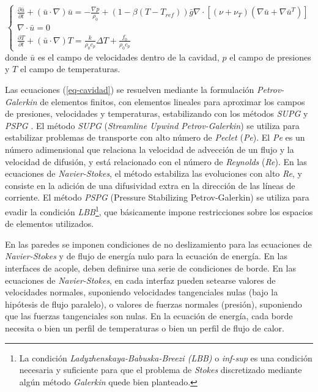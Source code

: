 \begin{equation}
\left\{ \begin{array}{lr}
\displaystyle \frac {\partial \bar{u}}{\partial t} + ( \bar{u} \cdot \nabla) \bar{u} = - \frac {\nabla p}{\rho_0}
+ \left( 1- \beta (T-T_{ref}) \right)\bar{g} \nabla \cdot \left[ \left( \nu + \nu_T \right) \left( \nabla \bar{u} + \nabla \bar{u}^T \right) \right] \\ [0.2cm]
\nabla \cdot \bar{u} = 0 \\ [0.2cm]
\displaystyle \frac {\partial T}{\partial t} + ( \bar{u} \cdot \nabla) T = \frac {k}{\rho_0 c_p} \Delta T + \frac{f_0}{\rho_0 c_p}
\label{eq-cavidad}
\end{array}
\right.
\end{equation}
donde $\bar{u}$ es el campo de velocidades dentro de la cavidad,
$p$ el campo de presiones y
$T$ el campo de temperaturas.

Las ecuaciones (\ref{eq-cavidad}) se resuelven mediante la formulación \textit{Petrov-Galerkin} \cite{galerkin} de elementos finitos, 
con elementos lineales para aproximar los campos de presiones, velocidades y temperaturas, 
estabilizando con los métodos \textit{SUPG} \cite{supg} y \textit{PSPG} \cite{pspg}.
El método \textit{SUPG} (\textit{Streamline Upwind Petrov-Galerkin}) se utiliza para estabilizar problemas de transporte con alto número de \textit{Peclet} (\textit{Pe}).
El \textit{Pe} es un número adimensional que relaciona la velocidad de advección de un flujo y la velocidad de difusión, y está relacionado con el número de \textit{Reynolds} (\textit{Re}).
En las ecuaciones de \textit{Navier-Stokes}, el método estabiliza las evoluciones con alto \textit{Re},
y consiste en la adición de una difusividad extra en la dirección de las líneas de corriente.
El método \textit{PSPG} (Pressure Stabilizing Petrov-Galerkin) se utiliza para evadir la condición \textit{LBB}\footnote{
La condición \textit{Ladyzhenskaya-Babuska-Breezi (LBB)} o \textit{inf-sup}
es una condición necesaria y suficiente para que el problema de \textit{Stokes}
discretizado mediante algún método \textit{Galerkin}
quede bien planteado.
},
que básicamente impone restricciones sobre los espacios de elementos utilizados.

En las paredes se imponen condiciones de no deslizamiento para las ecuaciones de \textit{Navier-Stokes} y de flujo de energía nulo para la ecuación de energía.
En las interfaces de acople, deben definirse una serie de condiciones de borde.
En las ecuaciones de \textit{Navier-Stokes}, en cada interfaz pueden setearse valores de velocidades normales, suponiendo velocidades tangenciales nulas (bajo la hipótesis de flujo paralelo),
o valores de fuerzas normales (presión), suponiendo que las fuerzas tangenciales son nulas.
En la ecuación de energía, cada borde necesita o bien un perfil de temperaturas o bien un perfil de flujo de calor.

